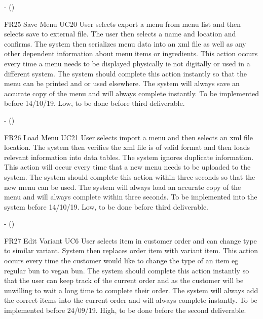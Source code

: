 \noindent \textbf{} -  ()\\
\begin{small}
	
\end{small}
\linebreak

FR25
Save Menu
UC20
User selects export a menu from menu list and then selects save to external file. The user then selects a name and location and confirms. The system then serializes menu data into an xml file as well as any other dependent information about menu items or ingredients. This action occurs every time a menu needs to be displayed physically ie not digitally or used in a different system. The system should complete this action instantly so that the menu can be printed and or used elsewhere. The system will always save an accurate copy of the menu and will always complete instantly. To be implemented before 14/10/19.
Low, to be done before third deliverable.

\noindent \textbf{} -  ()\\
\begin{small}
	
\end{small}
\linebreak

FR26
Load Menu
UC21
User selects import a menu and then selects an xml file location. The system then verifies the xml file is of valid format and then loads relevant information into data tables. The system ignores duplicate information. This action will occur every time that a new menu needs to be uploaded to the system. The system should complete this action within three seconds so that the new menu can be used. The system will always load an accurate copy of the menu and will always complete within three seconds. To be implemented into the system before 14/10/19.
Low, to be done before third deliverable.

\noindent \textbf{} -  ()\\
\begin{small}
	
\end{small}
\linebreak

FR27
Edit Variant
UC6
User selects item in customer order and can change type to similar variant. System then replaces order item with variant item. This action occurs every time the customer would like to change the type of an item eg regular bun to vegan bun. The system should complete this action instantly so that the user can keep track of the current order and as the customer will be unwilling to wait a long time to complete their order. The system will always add the correct items into the current order and will always complete instantly. To be implemented before 24/09/19.
High, to be done before the second deliverable.

